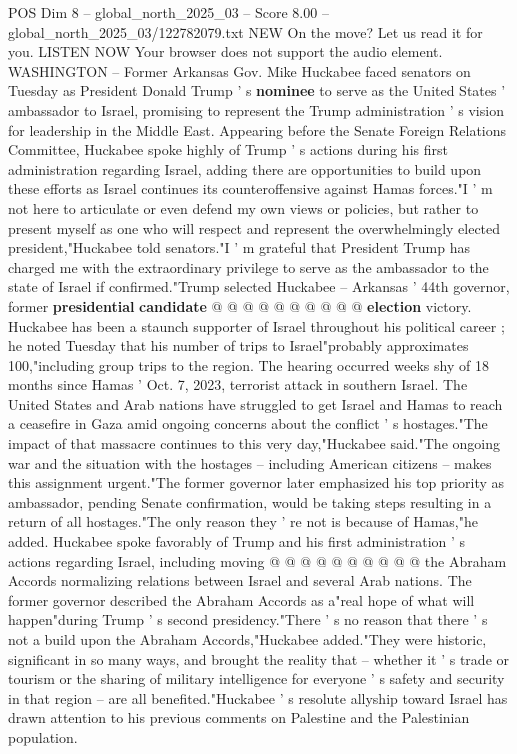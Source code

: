 \begin{textsample}{POS Dim 8 – global\_north\_2025\_03 – Score 8.00 – global\_north\_2025\_03/122782079.txt}  \label{ex:f8_pos_330}
NEW On the move?
Let us read it for you.
LISTEN NOW Your browser does not support the audio element.
WASHINGTON -- Former Arkansas Gov.
Mike Huckabee faced senators on Tuesday as President Donald Trump ' s \textbf{nominee} to serve as the United States ' ambassador to Israel, promising to represent the Trump administration ' s vision for leadership in the Middle East.
Appearing before the Senate Foreign Relations Committee, Huckabee spoke highly of Trump ' s actions during his first administration regarding Israel, adding there are opportunities to build upon these efforts as Israel continues its counteroffensive against Hamas forces."I ' m not here to articulate or even defend my own views or policies, but rather to present myself as one who will respect and represent the overwhelmingly elected president,"Huckabee told senators."I ' m grateful that President Trump has charged me with the extraordinary privilege to serve as the ambassador to the state of Israel if confirmed."Trump selected Huckabee -- Arkansas ' 44th governor, former \textbf{presidential} \textbf{candidate} @ @ @ @ @ @ @ @ @ @ \textbf{election} victory.
Huckabee has been a staunch supporter of Israel throughout his political career ; he noted Tuesday that his number of trips to Israel"probably approximates 100,"including group trips to the region.
The hearing occurred weeks shy of 18 months since Hamas ' Oct. 7, 2023, terrorist attack in southern Israel.
The United States and Arab nations have struggled to get Israel and Hamas to reach a ceasefire in Gaza amid ongoing concerns about the conflict ' s hostages."The impact of that massacre continues to this very day,"Huckabee said."The ongoing war and the situation with the hostages -- including American citizens -- makes this assignment urgent."The former governor later emphasized his top priority as ambassador, pending Senate confirmation, would be taking steps resulting in a return of all hostages."The only reason they ' re not is because of Hamas,"he added.
Huckabee spoke favorably of Trump and his first administration ' s actions regarding Israel, including moving @ @ @ @ @ @ @ @ @ @ the Abraham Accords normalizing relations between Israel and several Arab nations.
The former governor described the Abraham Accords as a"real hope of what will happen"during Trump ' s second presidency."There ' s no reason that there ' s not a build upon the Abraham Accords,"Huckabee added."They were historic, significant in so many ways, and brought the reality that -- whether it ' s trade or tourism or the sharing of military intelligence for everyone ' s safety and security in that region -- are all benefited."Huckabee ' s resolute allyship toward Israel has drawn attention to his previous comments on Palestine and the Palestinian population.

\end{textsample}
